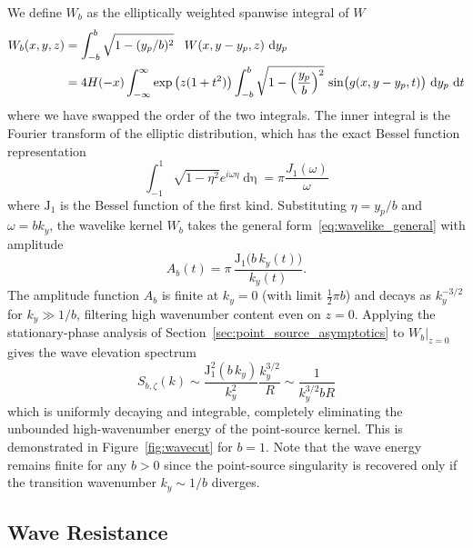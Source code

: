 \documentclass[]{JFM-FLM_Au}
\newcommand{\di}[1]{\mathop{\mathrm{d}#1}} %
\begin{document}
We define $W_b$ as the elliptically weighted spanwise integral of $W$
%
\begin{align*}
  W_b(x,y,z) &= \int_{-b}^{b} \sqrt{1-(y_p/b)^2}\quad\! W(x,y-y_p,z)\, \di{y_p} \notag\\
  &=  4H(-x)\int_{-\infty}^{\infty} \exp\left(z(1+t^2)\right) \int_{-b}^{b} \sqrt{1-\left(\frac{y_p}{b}\right)^2} \,\sin\bigl(g(x,y-y_p,t)\bigr)\,\di{y_p}\,\di t
\end{align*}
%
where we have swapped the order of the two integrals. The inner integral is the Fourier transform of the elliptic distribution, which has the exact Bessel function representation
\[
\int_{-1}^1 \sqrt{1-\eta^2} e^{i\omega\eta} \di\eta= \pi \frac{J_1(\omega)}\omega
\]
where $\mathrm{J}_1$ is the Bessel function of the first kind. Substituting $\eta=y_p/b$ and $\omega=bk_y$, the wavelike kernel $W_b$ takes the general form~\eqref{eq:wavelike_general} with amplitude
\begin{equation}
  A_b(t) = \pi\,\frac{\mathrm{J}_1\bigl(b\,k_y(t)\bigr)}{k_y(t)}.
  \label{eq:Ab}
\end{equation}
%
The amplitude function $A_b$ is finite at $k_y=0$ (with limit $\frac 12 \pi b$) and decays as $k_y^{-3/2}$ for $k_y \gg 1/b$, filtering high wavenumber content even on $z=0$. Applying the stationary-phase analysis of Section~\ref{sec:point_source_asymptotics} to $W_b|_{z=0}$ gives the wave elevation spectrum
%
\[
  S_{b,\zeta}(k) \sim \frac{\mathrm{J}_1^2\left(b\,k_y\right)}{k_y^2}\frac{k_y^{3/2}}{R} \sim \frac{1}{k_y^{3/2}bR} 
\]
%
which is uniformly decaying and integrable, completely eliminating the unbounded high-wavenumber energy of the point-source kernel. This is demonstrated in Figure~\ref{fig:wavecut} for $b=1$. Note that the wave energy remains finite for any $b>0$ since the point-source singularity is recovered only if the transition wavenumber $k_y\sim 1/b$ diverges.

\subsection{Wave Resistance}\label{ssec:wave_resistance}
\end{document}
